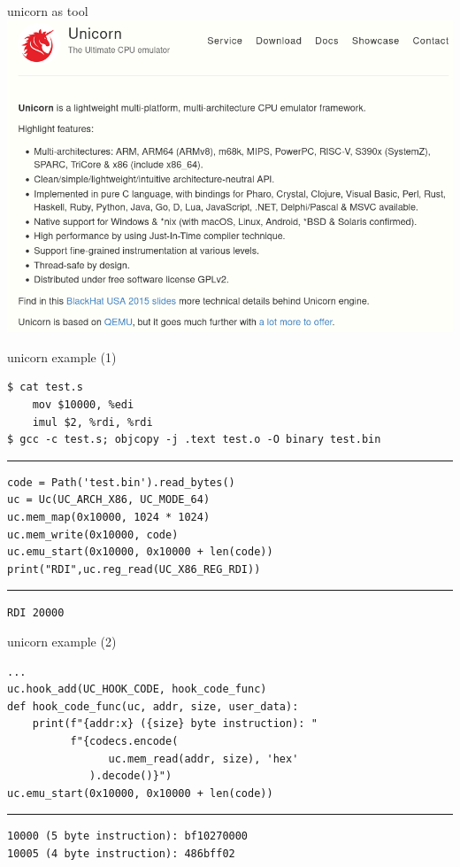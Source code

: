 
\begin{frame}{unicorn as tool}
\includegraphics[width=\textwidth]{../antianti/unicorn-page}
\end{frame}

\begin{frame}[fragile]{unicorn example (1)}
\begin{Verbatim}[fontsize=\small]
$ cat test.s
    mov $10000, %edi
    imul $2, %rdi, %rdi
$ gcc -c test.s; objcopy -j .text test.o -O binary test.bin
\end{Verbatim}
\vspace{.1cm}
\hrule
\vspace{.1cm}
\begin{Verbatim}[fontsize=\small]
code = Path('test.bin').read_bytes()
uc = Uc(UC_ARCH_X86, UC_MODE_64)
uc.mem_map(0x10000, 1024 * 1024)
uc.mem_write(0x10000, code)
uc.emu_start(0x10000, 0x10000 + len(code))
print("RDI",uc.reg_read(UC_X86_REG_RDI))
\end{Verbatim}
\vspace{.1cm}
\hrule
\vspace{.1cm}
\texttt{RDI 20000}
\end{frame}

\begin{frame}[fragile]{unicorn example (2)}
\begin{Verbatim}[fontsize=\small]
...
uc.hook_add(UC_HOOK_CODE, hook_code_func)
def hook_code_func(uc, addr, size, user_data):
    print(f"{addr:x} ({size} byte instruction): "
          f"{codecs.encode(
                uc.mem_read(addr, size), 'hex'
             ).decode()}")
uc.emu_start(0x10000, 0x10000 + len(code))
\end{Verbatim}
\hrule
\begin{Verbatim}[fontsize=\small]
10000 (5 byte instruction): bf10270000
10005 (4 byte instruction): 486bff02
\end{Verbatim}
\end{frame}

